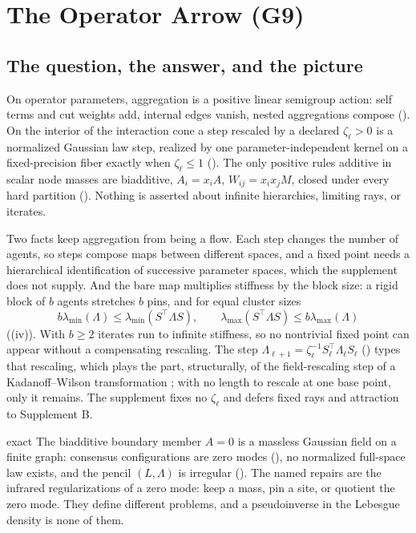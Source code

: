 \section{The Operator Arrow (G9)}
\label{comp:sg2-operator}

\subsection{The question, the answer, and the picture}

On operator parameters, aggregation is a positive linear semigroup action: self terms and cut weights add,
internal edges vanish, nested aggregations compose (). On the interior of the
interaction cone a step rescaled by a declared \(\zeta_\ell>0\) is a normalized Gaussian law step, realized by one
parameter-independent kernel on a fixed-precision fiber exactly when \(\zeta_\ell\leq1\)
(). The only positive rules additive in scalar node masses are biadditive,
\(A_i=x_iA\), \(W_{ij}=x_ix_jM\), closed under every hard partition (). Nothing is
asserted about infinite hierarchies, limiting rays, or iterates.

Two facts keep aggregation from being a flow. Each step changes the number of agents, so steps compose maps between
different spaces, and a fixed point needs a hierarchical identification of successive parameter spaces, which the
supplement does not supply. And the bare map multiplies stiffness by the block size: a rigid block of \(b\) agents
stretches \(b\) pins, and for equal cluster sizes
\[
b\lambda_{\min}(\Lambda)\leq\lambda_{\min}(S^\top\Lambda S),\qquad
\lambda_{\max}(S^\top\Lambda S)\leq b\lambda_{\max}(\Lambda)
\]
((iv)). With \(b\geq2\) iterates run to infinite stiffness, so no nontrivial fixed
point can appear without a compensating rescaling. The step \(\Lambda_{\ell+1}=\zeta_\ell^{-1}S_\ell^\top\Lambda_\ell S_\ell\)
() types that rescaling, which plays the part, structurally, of the field-rescaling step
of a Kadanoff--Wilson transformation \citep{kadanoff1966scaling,wilson1975renormalization}; with no length to rescale at
one base point, only it remains. The supplement fixes no \(\zeta_\ell\) and defers fixed rays and attraction to
Supplement B.

\begin{analogy}{exact}
The biadditive boundary member \(A=0\) is a massless Gaussian field on a finite graph: consensus configurations are
zero modes (), no normalized full-space law exists, and the pencil
\((L,\Lambda)\) is irregular (). The named repairs are the infrared regularizations of a
zero mode: keep a mass, pin a site, or quotient the zero mode. They define different problems, and a pseudoinverse
in the Lebesgue density is none of them.
\end{analogy}

